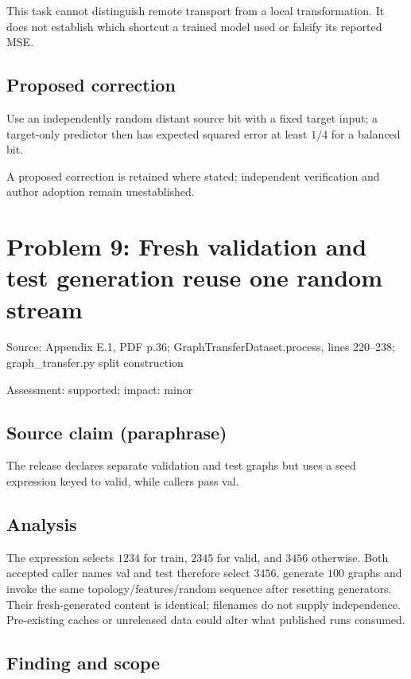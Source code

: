 \documentclass[11pt]{article}
\begin{document}
This task cannot distinguish remote transport from a local transformation. It does not establish which shortcut a trained model used or falsify its reported MSE.

\subsection*{Proposed correction}

Use an independently random distant source bit with a fixed target input; a target-only predictor then has expected squared error at least \(1/4\) for a balanced bit.

A proposed correction is retained where stated; independent verification and author adoption remain unestablished.

\section*{Problem 9: Fresh validation and test generation reuse one random stream}

Source: Appendix E.1, PDF p.36; GraphTransferDataset.process, lines 220–238; graph\_transfer.py split construction

Assessment: supported; impact: minor

\subsection*{Source claim (paraphrase)}

The release declares separate validation and test graphs but uses a seed expression keyed to valid, while callers pass val.

\subsection*{Analysis}

The expression selects \(1234\) for train, \(2345\) for valid, and \(3456\) otherwise. Both accepted caller names val and test therefore select \(3456\), generate \(100\) graphs and invoke the same topology/features/random sequence after resetting generators. Their fresh-generated content is identical; filenames do not supply independence. Pre-existing caches or unreleased data could alter what published runs consumed.

\subsection*{Finding and scope}
\end{document}
